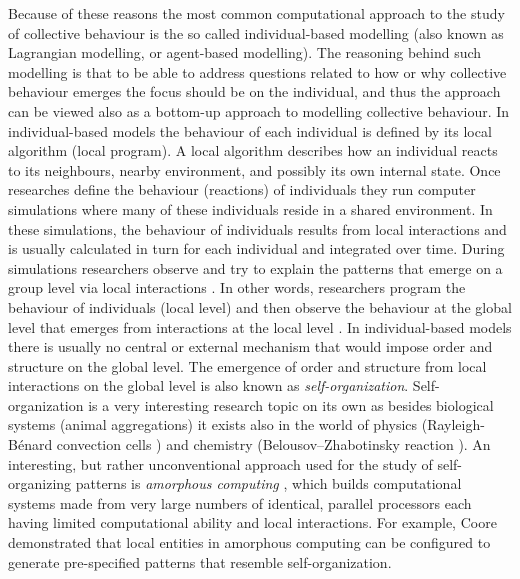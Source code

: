 Because of these reasons the most common computational approach to the study of collective behaviour is the so called individual-based modelling (also known as Lagrangian modelling, or agent-based modelling). The reasoning behind such modelling is that to be able to address questions related to how or why collective behaviour emerges the focus should be on the individual, and thus the approach can be viewed also as a bottom-up approach to modelling collective behaviour. In individual-based models the behaviour of each individual is defined by its local algorithm (local program). A local algorithm describes how an individual reacts to its neighbours, nearby environment, and possibly its own internal state. Once researches define the behaviour (reactions) of individuals they run computer simulations where many of these individuals reside in a shared environment. In these simulations, the behaviour of individuals results from local interactions and is usually calculated in turn for each individual and integrated over time. During simulations researchers observe and try to explain the patterns that emerge on a group level via local interactions \cite{grimm1999tenyears}. In other words, researchers program the behaviour of individuals (local level) and then observe the behaviour at the global level that emerges from interactions at the local level \cite{dewolf2005emergence}. In individual-based models there is usually no central or external mechanism that would impose order and structure on the global level. The emergence of order and structure from local interactions on the global level is also known as \emph{self-organization}. Self-organization is a very interesting research topic on its own as besides biological systems (\eg animal aggregations) it exists also in the world of physics (\eg Rayleigh-B{\'e}nard convection cells \cite{getling1998rayleigh}) and chemistry (\eg Belousov–Zhabotinsky reaction \cite{zhabotinsky1964periodic}). An interesting, but rather unconventional approach used for the study of self-organizing patterns is \emph{amorphous computing} \cite{abelson1996amorphous,abelson2000amorphous}, which builds computational systems made from very large numbers of identical, parallel processors each having limited computational ability and local interactions. For example, Coore \cite{coore1994botanical} demonstrated that local entities in amorphous computing can be configured to generate pre-specified patterns that resemble self-organization.

